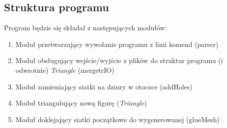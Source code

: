 \documentclass[a4paper,12pt,twoside]{article}
\begin{document}
\subsection{Struktura programu}

Program będzie się składał z następujących modułów:
\begin{enumerate}
\item Moduł przetwarzający wywołanie programu z linii komend (parser)
\item Moduł obsługujący wejście/wyjście z plików do struktur programu (i odwrotnie) \textit{Triangle} (mergetrIO)
\item Moduł zamieniający siatki na dziury w otoczce (addHoles)
\item Moduł triangulujący nową figurę (\textit{Triangle})
\item Moduł doklejający siatki początkowe do wygenerowanej (glueMesh)
\end{enumerate}
\end{document}

